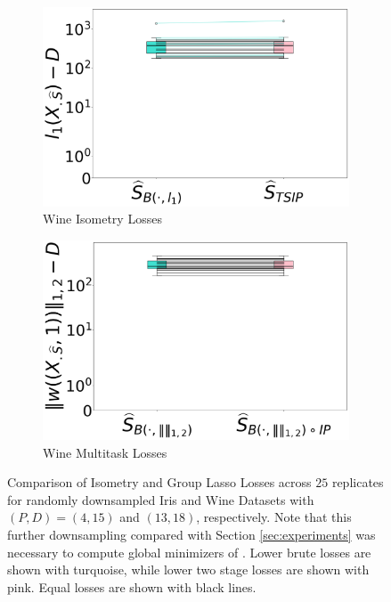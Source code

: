 \begin{figure}[t]
    \begin{subfigure}[b]{0.45\textwidth}
        \centering
        \includegraphics[width=\textwidth]{../figures/wine_standardized_0p1_1p0_isometry_losses}
        \caption{Wine Isometry Losses}
        \label{fig:wine_isometry_losses}
    \end{subfigure}
    \hfill
    \begin{subfigure}[b]{0.45\textwidth}
        \centering
        \includegraphics[width=\textwidth]{../figures/wine_standardized_0p1_1p0_group_lasso_losses}
        \caption{Wine Multitask Losses}
        \label{fig:wine_group_lasso_losses}
    \end{subfigure}
    \caption{Comparison of Isometry and Group Lasso Losses across $25$ replicates for randomly downsampled Iris and Wine Datasets with $(P,D) = (4,15)$ and $(13, 18)$, respectively.
    Note that this further downsampling compared with Section \ref{sec:experiments} was necessary to compute global minimizers of \brute.
    Lower brute losses are shown with turquoise, while lower two stage losses are shown with pink.
    Equal losses are shown with black lines.}
    \label{fig:comparison_losses}
\end{figure}

